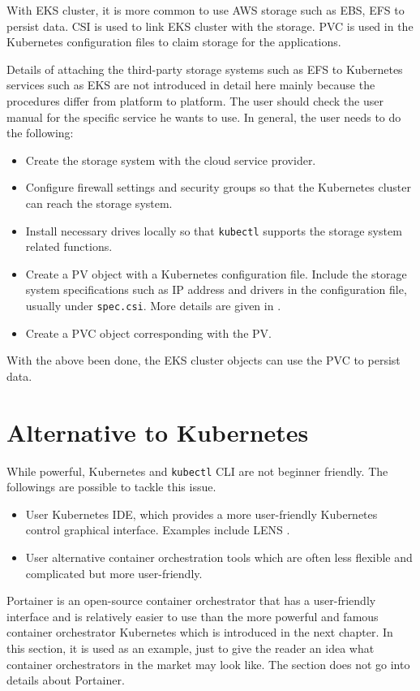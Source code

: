 With EKS cluster, it is more common to use AWS storage such as EBS, EFS to persist data. CSI is used to link EKS cluster with the storage. PVC is used in the Kubernetes configuration files to claim storage for the applications.

Details of attaching the third-party storage systems such as EFS to Kubernetes services such as EKS are not introduced in detail here mainly because the procedures differ from platform to platform. The user should check the user manual for the specific service he wants to use. In general, the user needs to do the following:
\begin{itemize}
  \item Create the storage system with the cloud service provider.
  \item Configure firewall settings and security groups so that the Kubernetes cluster can reach the storage system.
  \item Install necessary drives locally so that \verb|kubectl| supports the storage system related functions.
  \item Create a PV object with a Kubernetes configuration file. Include the storage system specifications such as IP address and drivers in the configuration file, usually under \texttt{spec.csi}. More details are given in \cite{kubernetes2024doc}.
  \item Create a PVC object corresponding with the PV.
\end{itemize}
With the above been done, the EKS cluster objects can use the PVC to persist data.

\section{Alternative to Kubernetes}

While powerful, Kubernetes and \verb|kubectl| CLI are not beginner friendly. The followings are possible to tackle this issue.
\begin{itemize}
  \item User Kubernetes IDE, which provides a more user-friendly Kubernetes control graphical interface. Examples include LENS \cite{lens2025homepace}. 
  \item User alternative container orchestration tools which are often less flexible and complicated but more user-friendly.
\end{itemize}

Portainer is an open-source container orchestrator that has a user-friendly interface and is relatively easier to use than the more powerful and famous container orchestrator Kubernetes which is introduced in the next chapter. In this section, it is used as an example, just to give the reader an idea what container orchestrators in the market may look like. The section does not go into details about Portainer.

